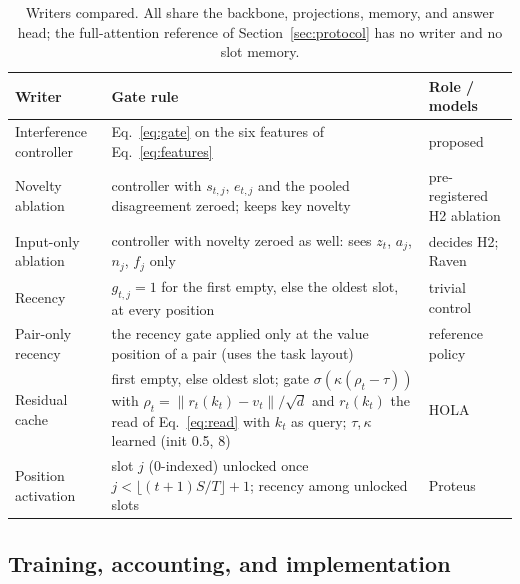 \documentclass[conference]{IEEEtran}
\begin{document}
\begin{table}[t]
\caption{Writers compared. All share the backbone, projections, memory, and
answer head; the full-attention reference of Section~\ref{sec:protocol} has no
writer and no slot memory.}
\label{tab:baselines}
\centering
\footnotesize
\begin{tabular}{@{}p{}p{}p{}@{}}
\toprule
Writer & Gate rule & Role / models \\
\midrule
Interference controller & Eq.~\eqref{eq:gate} on the six features of Eq.~\eqref{eq:features} & proposed \\
Novelty ablation & controller with $s_{t,j}$, $e_{t,j}$ and the pooled disagreement zeroed; keeps key novelty & pre-registered H2 ablation \\
Input-only ablation & controller with novelty zeroed as well: sees $z_t$, $a_j$, $n_j$, $f_j$ only & decides H2; Raven~\cite{afzal2026raven} \\
Recency & $g_{t,j} = 1$ for the first empty, else the oldest slot, at every position & trivial control \\
Pair-only recency & the recency gate applied only at the value position of a pair (uses the task layout) & reference policy \\
Residual cache & first empty, else oldest slot; gate $\sigma(\kappa(\rho_t - \tau))$ with $\rho_t = \lVert r_t(k_t) - v_t\rVert/\sqrt{d}$ and $r_t(k_t)$ the read of Eq.~\eqref{eq:read} with $k_t$ as query; $\tau, \kappa$ learned (init 0.5, 8) & HOLA~\cite{cui2026hola} \\
Position activation & slot $j$ (0-indexed) unlocked once $j < \lfloor (t+1) S / T \rfloor + 1$; recency among unlocked slots & Proteus~\cite{bayat2026proteus} \\
\bottomrule
\end{tabular}
\end{table}

\subsection{Training, accounting, and implementation}
\label{sec:training}
\end{document}
